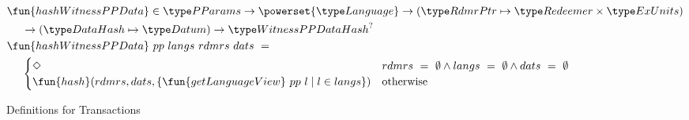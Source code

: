 \begin{figure*}[htb]
\begin{align*}
  \end{align*}
  \begin{align*}
  &\fun{hashWitnessPPData} \in\PParams \to \powerset{\Language} \to (\RdmrPtr \mapsto \Redeemer \times \ExUnits) \\
  &~~~~ \to (\DataHash \mapsto \Datum) \to \WitnessPPDataHash^? \\
  &\fun{hashWitnessPPData}~{pp}~{langs}~{rdmrs}~{dats}~=~ \\
                    &~~~~ \begin{cases}
                          \Nothing & rdmrs~=~\emptyset \land langs~=~\emptyset \land dats~=~\emptyset \\
                          \fun{hash} (rdmrs, dats, \{ \fun{getLanguageView}~pp~l \mid l \in langs \}) & \text{otherwise}
                        \end{cases}
  \end{align*}
  \caption{Definitions for Transactions}
  \label{fig:defs:utxo-shelley-1}
\end{figure*}


